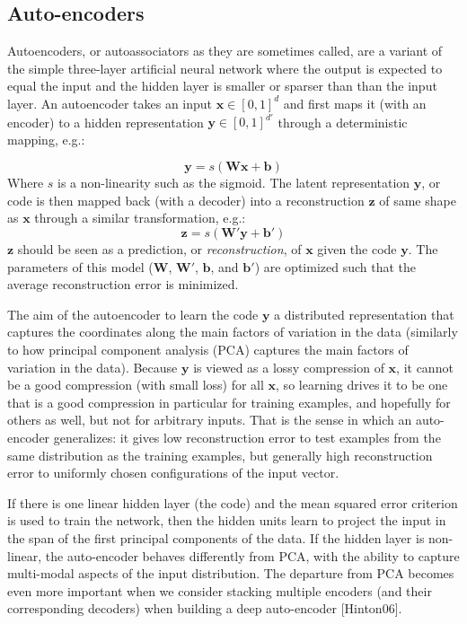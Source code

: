 \documentclass[12pt]{article}
\begin{document}
	\subsection{Auto-encoders}
	
Autoencoders, or autoassociators as they are sometimes called, are a variant of the simple three-layer artificial neural network where the output is expected to equal the input and the hidden layer is smaller or sparser than than the input layer. %
An autoencoder takes an input $\mathbf x\in[0,1]^d$ and first maps it (with an encoder) %
to a hidden representation $\mathbf y\in[0,1]^{d'}$ through a deterministic mapping, e.g.:

\[
\mathbf y = s(\mathbf W\mathbf x + \mathbf b)
\]
Where $s$ is a non-linearity such as the sigmoid. %
The latent representation $\mathbf y$, or code is then mapped back (with a decoder) into a reconstruction $\mathbf z$ of same shape as $\mathbf x$  through a similar transformation, e.g.:
\[
\mathbf z = s(\mathbf W'\mathbf y + \mathbf b')
\]
$\mathbf z$ should be seen as a prediction, or {\it reconstruction}, of  $\mathbf x$ given the code  $\mathbf y$. The parameters of this model ($\mathbf W$, $\mathbf W'$, $\mathbf b$, and $\mathbf b'$) are optimized such that the average reconstruction error is minimized\cite{Bengio09}.

The aim of the autoencoder to learn the code $\mathbf y$ a distributed representation that captures the coordinates along the main factors of variation in the data (similarly to how principal component analysis (PCA) captures the main factors of variation in the data). Because $\mathbf y$ is viewed as a lossy compression of $\mathbf x$, it cannot be a good compression (with small loss) for all $\mathbf x$, so learning drives it to be one that is a good compression in particular for training examples, and hopefully for others as well, but not for arbitrary inputs. That is the sense in which an auto-encoder generalizes: it gives low reconstruction error to test examples from the same distribution as the training examples, but generally high reconstruction error to uniformly chosen configurations of the input vector.

If there is one linear hidden layer (the code) and the mean squared error criterion is used to train the network, then the  hidden units learn to project the input in the span of the first  principal components of the data. If the hidden layer is non-linear, the auto-encoder behaves differently from PCA, with the ability to capture multi-modal aspects of the input distribution. The departure from PCA becomes even more important when we consider stacking multiple encoders (and their corresponding decoders) when building a deep auto-encoder [Hinton06].
\end{document}
